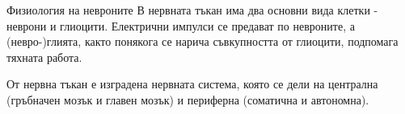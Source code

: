 \begin{frame}[t]{Физиология на невроните}
  В нервната тъкан има два основни вида клетки - неврони и глиоцити.
  Електрични импулси се предават по невроните, а (невро-)глията, 
  както понякога се нарича съвкупността от глиоцити, подпомага тяхната работа.

  От нервна тъкан е изградена нервната система, която се дели на централна (гръбначен мозък и главен мозък) и периферна (соматична и автономна).

\end{frame}